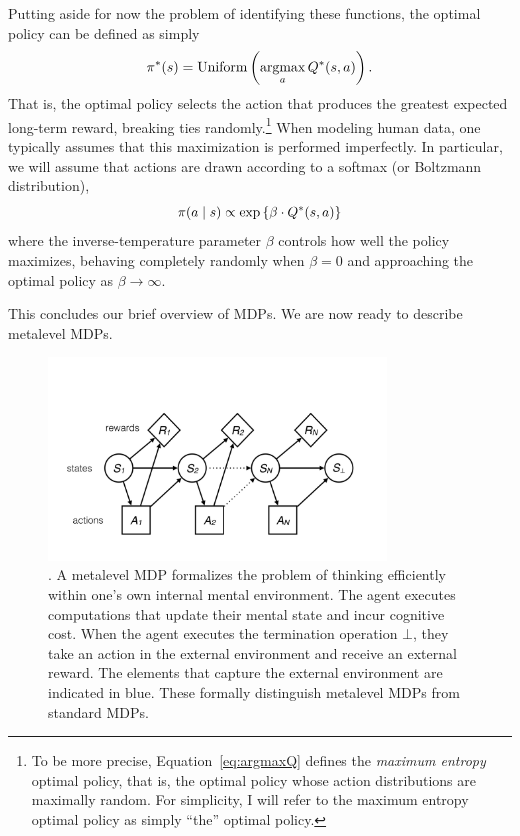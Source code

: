 Putting aside for now the problem of identifying these functions, the optimal policy can be defined as simply
%
\begin{equation}\label{eq:argmaxQ}
  \pi^*(s) = \mathrm{Uniform}\left(\operatorname*{argmax}_a Q^*(s, a)\right).
\end{equation}
%
That is, the optimal policy selects the action that produces the greatest expected long-term reward, breaking ties randomly.\footnote{%
  To be more precise, Equation~\ref{eq:argmaxQ} defines the \emph{maximum entropy} optimal policy, that is, the optimal policy whose action distributions are maximally random. For simplicity, I will refer to the maximum entropy optimal policy as simply ``the'' optimal policy.
} When modeling human data, one typically assumes that this maximization is performed imperfectly. In particular, we will assume that actions are drawn according to a softmax (or Boltzmann distribution),
%
\begin{equation}\label{eq:softoptimal}
  \pi(a \mid s) \propto \exp\left\{\beta \cdot Q^*(s, a)\right\}
\end{equation}
%
where the inverse-temperature parameter $\beta$ controls how well the policy maximizes, behaving completely randomly when $\beta = 0$ and approaching the optimal policy as $\beta \rightarrow \infty$.

This concludes our brief overview of MDPs. We are now ready to describe metalevel MDPs.


\begin{figure}
  \centering
  \includegraphics[width=0.8\textwidth,page=2,trim=0 100 0 50]{diagrams/metamdp.pdf}
  \caption{.
    A metalevel MDP formalizes the problem of thinking efficiently within one's own internal mental environment. The agent executes computations that update their mental state and incur cognitive cost. When the agent executes the termination operation $\bot$, they take an action in the external environment and receive an external reward. The elements that capture the external environment are indicated in blue. These formally distinguish metalevel MDPs from standard MDPs.
  }
  \label{fig:metamdp-diagram}
\end{figure}



